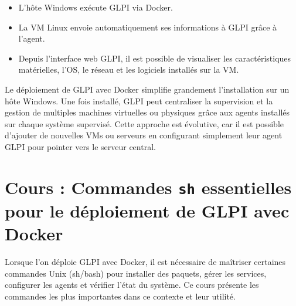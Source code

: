 \documentclass[11pt,a4paper]{article}
\begin{document}
\begin{tcolorbox}[title={6. Résultat attendu}]
\begin{itemize}
  \item L’hôte Windows exécute GLPI via Docker.  
  \item La VM Linux envoie automatiquement ses informations à GLPI grâce à l’agent.  
  \item Depuis l’interface web GLPI, il est possible de visualiser les caractéristiques matérielles, l’OS, le réseau et les logiciels installés sur la VM.  
\end{itemize}
\end{tcolorbox}

\begin{tcolorbox}[title={Conclusion}]
Le déploiement de GLPI avec Docker simplifie grandement l’installation sur un hôte Windows.  
Une fois installé, GLPI peut centraliser la supervision et la gestion de multiples machines virtuelles ou physiques grâce aux agents installés sur chaque système supervisé.  
Cette approche est évolutive, car il est possible d’ajouter de nouvelles VMs ou serveurs en configurant simplement leur agent GLPI pour pointer vers le serveur central.
\end{tcolorbox}


\section{Cours : Commandes \texttt{sh} essentielles pour le déploiement de GLPI avec Docker}


\begin{tcolorbox}[title={Introduction}]
Lorsque l’on déploie GLPI avec Docker, il est nécessaire de maîtriser certaines commandes Unix (sh/bash) pour installer des paquets, gérer les services, configurer les agents et vérifier l’état du système.  
Ce cours présente les commandes les plus importantes dans ce contexte et leur utilité.
\end{tcolorbox}
\end{document}
